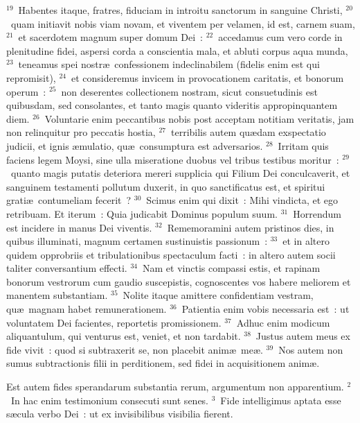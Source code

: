 ${}^{19}$~Habentes itaque, fratres, fiduciam in introitu sanctorum in sanguine Christi,
${}^{20}$~quam initiavit nobis viam novam, et viventem per velamen, id est, carnem suam,
${}^{21}$~et sacerdotem magnum super domum Dei~:
${}^{22}$~accedamus cum vero corde in plenitudine fidei, aspersi corda a conscientia mala, et abluti corpus aqua munda,
${}^{23}$~teneamus spei nostr\ae\ confessionem indeclinabilem (fidelis enim est qui repromisit),
${}^{24}$~et consideremus invicem in provocationem caritatis, et bonorum operum~:
${}^{25}$~non deserentes collectionem nostram, sicut consuetudinis est quibusdam, sed consolantes, et tanto magis quanto videritis appropinquantem diem.
${}^{26}$~Voluntarie enim peccantibus nobis post acceptam notitiam veritatis, jam non relinquitur pro peccatis hostia,
${}^{27}$~terribilis autem qu\ae dam exspectatio judicii, et ignis \ae mulatio, qu\ae\ consumptura est adversarios.
${}^{28}$~Irritam quis faciens legem Moysi, sine ulla miseratione duobus vel tribus testibus moritur~:
${}^{29}$~quanto magis putatis deteriora mereri supplicia qui Filium Dei conculcaverit, et sanguinem testamenti pollutum duxerit, in quo sanctificatus est, et spiritui grati\ae\ contumeliam fecerit~?
${}^{30}$~Scimus enim qui dixit~: Mihi vindicta, et ego retribuam. Et iterum~: Quia judicabit Dominus populum suum.
${}^{31}$~Horrendum est incidere in manus Dei viventis.
${}^{32}$~Rememoramini autem pristinos dies, in quibus illuminati, magnum certamen sustinuistis passionum~:
${}^{33}$~et in altero quidem opprobriis et tribulationibus spectaculum facti~: in altero autem socii taliter conversantium effecti.
${}^{34}$~Nam et vinctis compassi estis, et rapinam bonorum vestrorum cum gaudio suscepistis, cognoscentes vos habere meliorem et manentem substantiam.
${}^{35}$~Nolite itaque amittere confidentiam vestram, qu\ae\ magnam habet remunerationem.
${}^{36}$~Patientia enim vobis necessaria est~: ut voluntatem Dei facientes, reportetis promissionem.
${}^{37}$~Adhuc enim modicum aliquantulum, qui venturus est, veniet, et non tardabit.
${}^{38}$~Justus autem meus ex fide vivit~: quod si subtraxerit se, non placebit anim\ae\ me\ae .
${}^{39}$~Nos autem non sumus subtractionis filii in perditionem, sed fidei in acquisitionem anim\ae .

\bchapter
\lettrine[lines=3,image=true,loversize=0.05,lraise=-0.03]{E}{}st autem fides sperandarum substantia rerum, argumentum non apparentium.
${}^{2}$~In hac enim testimonium consecuti sunt senes.
${}^{3}$~Fide intelligimus aptata esse s\ae cula verbo Dei~: ut ex invisibilibus visibilia fierent.


